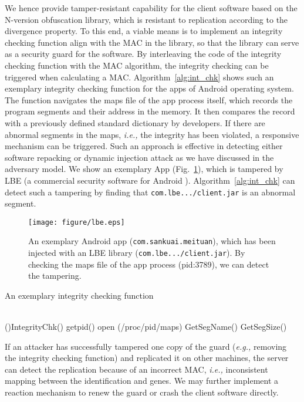 \documentclass[10pt, conference]{IEEEtran}
\begin{document}
We hence provide tamper-resistant capability for the client software based on the N-version obfuscation library, which is resistant to replication according to the divergence property.  To this end, a viable means is to implement an integrity checking function align with the MAC in the library, so that the library can serve as a security guard for the software.  By interleaving the code of the integrity checking function with the MAC algorithm, the integrity checking can be triggered when calculating a MAC.  Algorithm~\ref{alg:int_chk} shows such an exemplary integrity checking function for the apps of Android operating system.  The function navigates the maps file of the app process itself, which records the program segments and their address in the memory.  It then compares the record with a previously defined standard dictionary by developers.  If there are abnormal segments in the maps, \textit{i.e.,} the integrity has been violated, a responsive mechanism can be triggered.  Such an approach is effective in detecting either software repacking or dynamic injection attack as we have discussed in the adversary model.  We show an exemplary App (Fig.~\ref{fig:lbe}), which is tampered by LBE (a commercial security software for Android \cite{lbe}).  Algorithm~\ref{alg:int_chk} can detect such a tampering by finding that \texttt{com.lbe.../client.jar} is an abnormal segment.


\begin{figure}[t]
\centering
\texttt{[image: figure/lbe.eps]}
\caption{An exemplary Android app (\texttt{com.sankuai.meituan}), which has been injected with an LBE library (\texttt{com.lbe.../client.jar}).  By checking the maps file of the app process (pid:3789), we can detect the tampering.}
\label{fig:lbe}
\end{figure}

\begin{algorithm} [t]
\caption{An exemplary integrity checking function}
\label{alg:int_chk}
\small
\KwData {}  \\
\Fn(){IntegrityChk()}{}
	 getpid()\;
	 open (/proc/pid/maps)\;
	 {		
		 GetSegName()\;
		 GetSegSize()\;
		{
		}
	}
\end{algorithm}

If an attacker has successfully tampered one copy of the guard (\textit{e.g.,} removing the integrity checking function) and replicated it on other machines, the server can detect the replication because of an incorrect MAC, \textit{i.e.,} inconsistent mapping between the identification and genes.  We may further implement a reaction mechanism to renew the guard or crash the client software directly.  
\end{document}
